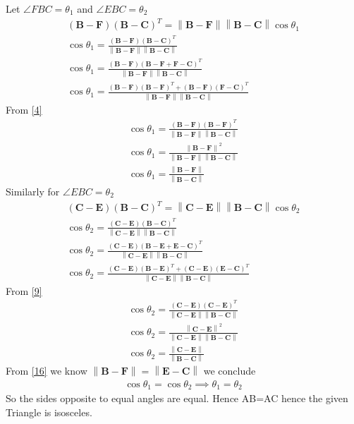\documentclass[journal,12pt,twocolumn]{IEEEtran}
\let\vec\mathbf
\newcommand{\norm}[1]{\left\lVert#1\right\rVert}
\begin{document}
    Let $\angle FBC=\theta_1$  and  $\angle EBC=\theta_2$
    \begin{align}
        \left(\vec{B}-\vec{F}\right)\left(\vec{B}-\vec{C}\right)^T=\norm{\vec{B}-\vec{F}}\norm{\vec{B}-\vec{C}}\cos\theta_1\\
        \cos{\theta_1}=\frac{\left(\vec{B}-\vec{F}\right)\left(\vec{B}-\vec{C}\right)^T}{\norm{\vec{B}-\vec{F}}\norm{\vec{B}-\vec{C}}}\\
        \cos{\theta_1}=\frac{\left(\vec{B}-\vec{F}\right)\left(\vec{B}-\vec{F}+\vec{F}-\vec{C}\right)^T}{\norm{\vec{B}-\vec{F}}\norm{\vec{B}-\vec{C}}}\\
        \cos{\theta_1}=\frac{\left(\vec{B}-\vec{F}\right)\left(\vec{B}-\vec{F}\right)^T +\left(\vec{B}-\vec{F}\right)\left(\vec{F}-\vec{C}\right)^T}{\norm{\vec{B}-\vec{F}}\norm{\vec{B}-\vec{C}}}
        \end{align}
        From \eqref{4}
        \begin{align}
          \cos{\theta_1}=\frac{\left(\vec{B}-\vec{F}\right)\left(\vec{B}-\vec{F}\right)^T}{\norm{\vec{B}-\vec{F}}\norm{\vec{B}-\vec{C}}} \\
          \cos{\theta_1}=\frac{\norm{\vec{B}-\vec{F}}^2}{\norm{\vec{B}-\vec{F}}\norm{\vec{B}-\vec{C}}}\\
          \cos{\theta_1}=\frac{\norm{\vec{B}-\vec{F}}}{\norm{\vec{B}-\vec{C}}}
        \end{align}
        Similarly for $\angle EBC=\theta_2$
       \begin{align}
        \left(\vec{C}-\vec{E}\right)\left(\vec{B}-\vec{C}\right)^T=\norm{\vec{C}-\vec{E}}\norm{\vec{B}-\vec{C}}\cos\theta_2\\
        \cos{\theta_2}=\frac{\left(\vec{C}-\vec{E}\right)\left(\vec{B}-\vec{C}\right)^T}{\norm{\vec{C}-\vec{E}}\norm{\vec{B}-\vec{C}}}\\
        \cos{\theta_2}=\frac{\left(\vec{C}-\vec{E}\right)\left(\vec{B}-\vec{E}+\vec{E}-\vec{C}\right)^T}{\norm{\vec{C}-\vec{E}}\norm{\vec{B}-\vec{C}}}\\
        \cos{\theta_2}=\frac{\left(\vec{C}-\vec{E}\right)\left(\vec{B}-\vec{E}\right)^T +\left(\vec{C}-\vec{E}\right)\left(\vec{E}-\vec{C}\right)^T}{\norm{\vec{C}-\vec{E}}\norm{\vec{B}-\vec{C}}}
        \end{align}
        From {\eqref{9}}
        \begin{align}
          \cos{\theta_2}=\frac{\left(\vec{C}-\vec{E}\right)\left(\vec{C}-\vec{E}\right)^T}{\norm{\vec{C}-\vec{E}}\norm{\vec{B}-\vec{C}}} \\
          \cos{\theta_2}=\frac{\norm{\vec{C}-\vec{E}}^2}{\norm{\vec{C}-\vec{E}}\norm{\vec{B}-\vec{C}}}\\
          \cos{\theta_2}=\frac{\norm{\vec{C}-\vec{E}}}{\norm{\vec{B}-\vec{C}}}
        \end{align}
        From \eqref{16} we know $\norm{\vec{B}-\vec{F}}=\norm{\vec{E}-\vec{C}}$ we conclude
        \begin{align}
            \cos\theta_1=\cos\theta_2
            \implies\theta_1=\theta_2
        \end{align}
        So the sides opposite to equal angles are equal. Hence AB=AC hence the given Triangle is isosceles.
    
\end{document}
